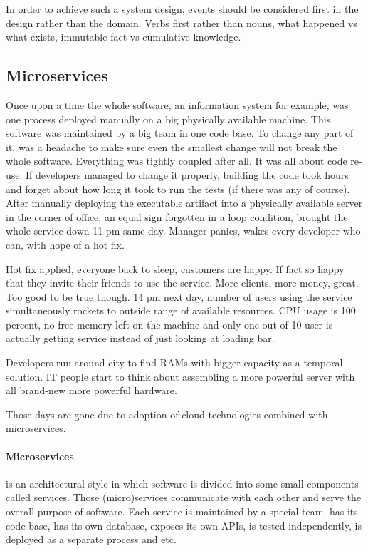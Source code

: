 \documentclass[a4]{report}
\begin{document}
    In order to achieve such a system design, events should be considered first in the design rather than the domain.
    Verbs first rather than nouns, what happened vs what exists, immutable fact vs cumulative knowledge.

    \subsection{Microservices}
    Once upon a time the whole software, an information system for example, was one process deployed manually on a big
    physically available machine.
    This software was maintained by a big team in one code base.
    To change any part of it, was a headache to make sure even the smallest change will not break the whole software.
    Everything was tightly coupled after all.
    It was all about code re-use.
    If developers managed to change it properly, building the code took hours and forget about how long it took to
    run the tests (if there was any of course).
    After manually deploying the executable artifact into a physically available server in the corner of office, an
    equal sign forgotten in a loop condition, brought the whole service down 11 pm same day.
    Manager panics, wakes every developer who can, with hope of a hot fix.

    Hot fix applied, everyone back to sleep, customers are happy.
    If fact so happy that they invite their friends to use the service.
    More clients, more money, great.
    Too good to be true though.
    14 pm next day, number of users using the service simultaneously rockets to outside range of available resources.
    CPU usage is 100 percent, no free memory left on the machine and only one out of 10 user is actually getting
    service instead of just looking at loading bar.

    Developers run around city to find RAMs with bigger capacity as a temporal solution.
    IT people start to think about assembling a more powerful server with all brand-new more powerful hardware.

    Those days are gone due to adoption of cloud technologies combined with microservices.

    \paragraph{Microservices} is an architectural style in which software is divided into some small components
    called services.
    Those (micro)services communicate with each other and serve the overall purpose of software.
    Each service is maintained by a special team, has its code base, has its own database, exposes its own APIs, is
    tested independently, is deployed as a separate process and etc.
\end{document}
